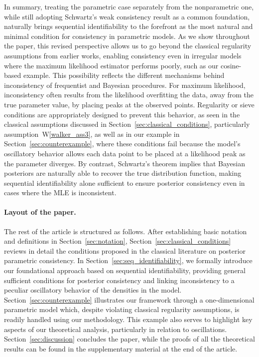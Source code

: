 \documentclass[11pt,twoside]{article}
\newcommand{\Wref}[1]{W\ref{#1}}
\begin{document}
In summary, treating the parametric case separately from the nonparametric one, while still adopting Schwartz’s weak consistency result as a common foundation, naturally brings sequential identifiability to the forefront as the most natural and minimal condition for consistency in parametric models. As we show throughout the paper, this revised perspective allows us to go beyond the classical regularity assumptions from earlier works, enabling consistency even in irregular models where the maximum likelihood estimator performs poorly, such as our cosine-based example. This possibility reflects the different mechanisms behind inconsistency of frequentist and Bayesian procedures. For maximum likelihood, inconsistency often results from the likelihood overfitting the data, away from the true parameter value, by placing peaks at the observed points. Regularity or sieve conditions are appropriately designed to prevent this behavior, as seen in the classical assumptions discussed in Section~\ref{sec:classical_conditions}, particularly assumption~\Wref{walker_ass3}, as well as in our example in Section~\ref{sec:counterexample}, where these conditions fail because the model's oscillatory behavior allows each data point to be placed at a likelihood peak as the parameter diverges. By contrast, Schwartz's theorem implies that Bayesian posteriors are naturally able to recover the true distribution function, making sequential identifiability alone sufficient to ensure posterior consistency even in cases where the MLE is inconsistent.















\paragraph{Layout of the paper.} The rest of the article is structured as follows. After establishing basic notation and definitions in Section~\ref{sec:notation}, Section~\ref{sec:classical_conditions} reviews in detail the conditions proposed in the classical literature on posterior parametric consistency. In Section~\ref{sec:seq_identifiability}, we formally introduce our foundational approach based on sequential identifiability, providing general sufficient conditions for posterior consistency and linking inconsistency to a peculiar oscillatory behavior of the densities in the model. Section~\ref{sec:counterexample} illustrates our framework through a one-dimensional parametric model which, despite violating classical regularity assumptions, is readily handled using our methodology. This example also serves to highlight key aspects of our theoretical analysis, particularly in relation to oscillations. Section~\ref{sec:discussion} concludes the paper, while the proofs of all the theoretical results can be found in the supplementary material at the end of the article.
\end{document}
